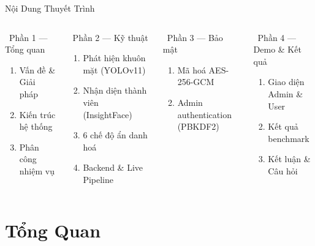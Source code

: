 \documentclass[aspectratio=169, 11pt]{beamer}
\begin{document}
\begin{frame}{Nội Dung Thuyết Trình}
\begin{columns}[T]
\begin{block}{\faList\ Phần 1 --- Tổng quan}
\begin{enumerate}\footnotesize
  \item Vấn đề \& Giải pháp
  \item Kiến trúc hệ thống
  \item Phân công nhiệm vụ
\end{enumerate}
\end{block}
\begin{block}{\faCog\ Phần 2 --- Kỹ thuật}
\begin{enumerate}\footnotesize\setcounter{enumi}{3}
  \item Phát hiện khuôn mặt (YOLOv11)
  \item Nhận diện thành viên (InsightFace)
  \item 6 chế độ ẩn danh hoá
  \item Backend \& Live Pipeline
\end{enumerate}
\end{block}
\begin{block}{\faLock\ Phần 3 --- Bảo mật}
\begin{enumerate}\footnotesize\setcounter{enumi}{7}
  \item Mã hoá AES-256-GCM
  \item Admin authentication (PBKDF2)
\end{enumerate}
\end{block}
\begin{block}{\faDesktop\ Phần 4 --- Demo \& Kết quả}
\begin{enumerate}\footnotesize\setcounter{enumi}{9}
  \item Giao diện Admin \& User
  \item Kết quả benchmark
  \item Kết luận \& Câu hỏi
\end{enumerate}
\end{block}
\end{columns}
\end{frame}

\section{Tổng Quan}
\end{document}
